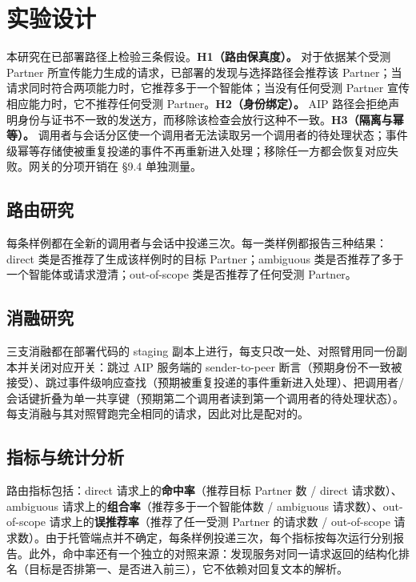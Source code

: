 \documentclass[11pt,a4paper]{article}
\begin{document}
\section{实验设计}

本研究在已部署路径上检验三条假设。\textbf{H1（路由保真度）。} 对于依据某个受测 Partner 所宣传能力生成的请求，已部署的发现与选择路径会推荐该 Partner；当请求同时符合两项能力时，它推荐多于一个智能体；当没有任何受测 Partner 宣传相应能力时，它不推荐任何受测 Partner。\textbf{H2（身份绑定）。} AIP 路径会拒绝声明身份与证书不一致的发送方，而移除该检查会放行这种不一致。\textbf{H3（隔离与幂等）。} 调用者与会话分区使一个调用者无法读取另一个调用者的待处理状态；事件级幂等存储使被重复投递的事件不再重新进入处理；移除任一方都会恢复对应失败。网关的分项开销在 §9.4 单独测量。

\subsection{路由研究}

每条样例都在全新的调用者与会话中投递三次。每一类样例都报告三种结果：direct 类是否推荐了生成该样例时的目标 Partner；ambiguous 类是否推荐了多于一个智能体或请求澄清；out-of-scope 类是否推荐了任何受测 Partner。

\subsection{消融研究}

三支消融都在部署代码的 staging 副本上进行，每支只改一处、对照臂用同一份副本并关闭对应开关：跳过 AIP 服务端的 sender-to-peer 断言（预期身份不一致被接受）、跳过事件级响应查找（预期被重复投递的事件重新进入处理）、把调用者/会话键折叠为单一共享键（预期第二个调用者读到第一个调用者的待处理状态）。每支消融与其对照臂跑完全相同的请求，因此对比是配对的。

\subsection{指标与统计分析}

路由指标包括：direct 请求上的\textbf{命中率}（推荐目标 Partner 数 / direct 请求数）、ambiguous 请求上的\textbf{组合率}（推荐多于一个智能体数 / ambiguous 请求数）、out-of-scope 请求上的\textbf{误推荐率}（推荐了任一受测 Partner 的请求数 / out-of-scope 请求数）。由于托管端点并不确定，每条样例投递三次，每个指标按每次运行分别报告。此外，命中率还有一个独立的对照来源：发现服务对同一请求返回的结构化排名（目标是否排第一、是否进入前三），它不依赖对回复文本的解析。
\end{document}
